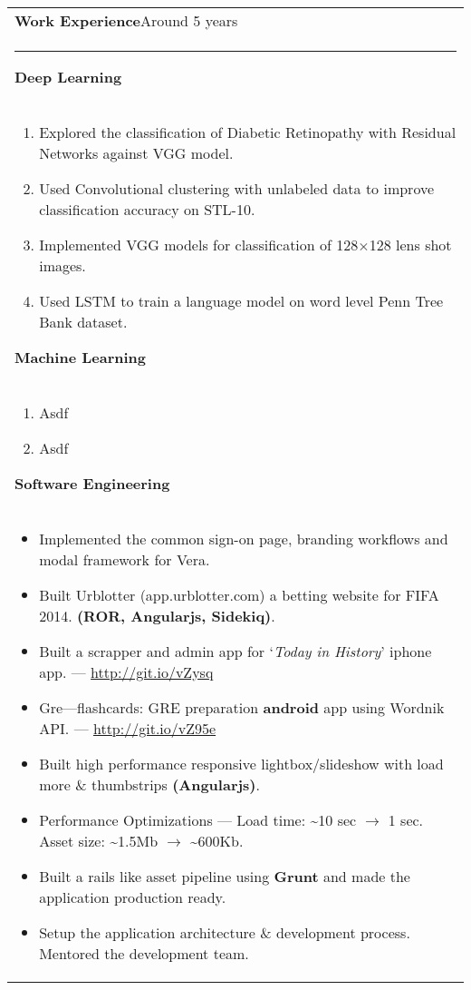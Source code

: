 \documentclass{article}
\begin{document}
\begin{tabular}{p{\dimexpr\linewidth-2\tabcolsep}}
    \textbf{\large{Work Experience}}\hfill Around 5 years \\
    \noindent\rule{\textwidth}{0.4pt}
    \bfseries Deep Learning \\
    \begin{enumerate}
        \item Explored the classification of Diabetic Retinopathy with Residual Networks against VGG model.
        \item Used Convolutional clustering with unlabeled data to improve classification accuracy on STL-10.
        \item Implemented VGG models for classification of 128$\times$128 lens shot images.
        \item Used LSTM to train a language model on word level Penn Tree Bank dataset.
    \end{enumerate}

    \bigskip
    \bfseries Machine Learning \\
    \begin{enumerate}
        \item Asdf
        \item Asdf
    \end{enumerate}

    \bigskip
    \bfseries Software Engineering \\
    \begin{itemize}
        \item Implemented the common sign-on page, branding workflows and modal framework for Vera.
        \item Built Urblotter (app.urblotter.com) a betting website for FIFA 2014. \textbf{(ROR, Angularjs, Sidekiq)}.
        \item Built a scrapper and admin app for `\textit{Today in History}' iphone app. --- \url{http://git.io/vZysq}
        \item Gre---flashcards: GRE preparation \textbf{android} app using Wordnik API\@. --- \url{http://git.io/vZ95e}
    \end{itemize}

    \bigskip
    \begin{itemize}
        \item Built high performance responsive lightbox/slideshow with load more \& thumbstrips \textbf{(Angularjs)}.
        \item Performance Optimizations --- Load time: \textasciitilde10 sec \( \rightarrow \) 1 sec.  
            Asset size: \textasciitilde1.5Mb \( \rightarrow \) \textasciitilde600Kb.
        \item Built a rails like asset pipeline using \textbf{Grunt} and made the application production ready.
        \item Setup the application architecture \& development process. Mentored the development team.
    \end{itemize}


\end{tabular}
\end{document}
